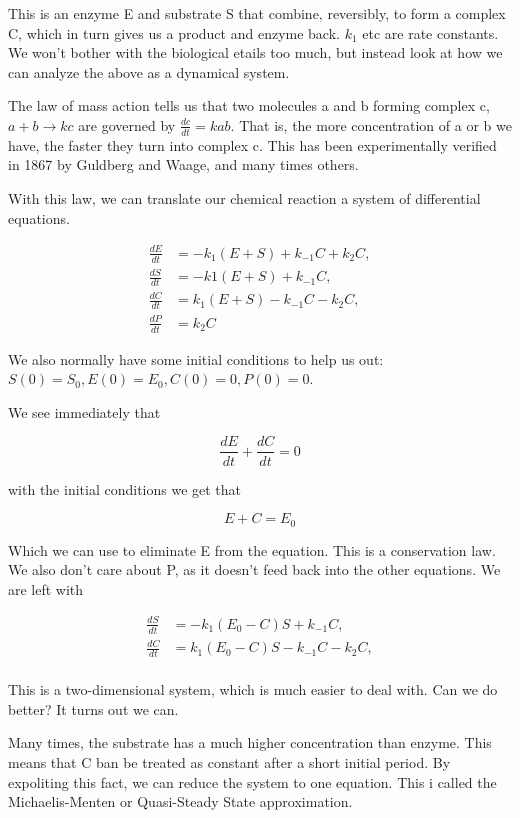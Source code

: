 \documentclass[12pt]{article}
\begin{document}
This is an enzyme E and substrate S that combine, reversibly, to form a complex
C, which in turn gives us a product and enzyme back. $k_1$ etc are rate
constants. We won't bother with the biological etails too much, but instead look
at how we can analyze the above as a dynamical system.

The law of mass action tells us that two molecules a and b forming complex c,
$a+b \rightarrow k c$ are governed by $\frac{dc}{dt} = kab$. That is, the more
concentration of a or b we have, the faster they turn into complex c. This has
been experimentally verified in 1867 by Guldberg and Waage, and many times
others.

With this law, we can translate our chemical reaction a system of differential
equations.

\begin{align}
\frac{dE}{dt} &= -k_1(E+S) + k_{-1}C + k_2C, \\
\frac{dS}{dt} &= -k1(E+S) + k_{-1}C, \\
\frac{dC}{dt} &= k_1(E+S) - k_{-1}C - k_2C, \\
\frac{dP}{dt} &= k_2C
\end{align}

We also normally have some initial conditions to help us out: $S(0) = S_0, E(0)
= E_0, C(0)=0, P(0)=0$.

We see immediately that

\begin{equation}
\frac{dE}{dt} + \frac{dC}{dt} = 0
\end{equation}

with the initial conditions we get that

\begin{equation}
E + C = E_0
\end{equation}

Which we can use to eliminate E from the equation. This is a conservation law.
We also don't care about P, as it doesn't feed back into the other equations. We
are left with

\begin{align}
\frac{dS}{dt} &= -k_1(E_0 - C)S + k_{-1}C, \\
\frac{dC}{dt} &= k_1(E_0 - C)S - k_{-1}C - k_2 C, \\
\end{align}

This is a two-dimensional system, which is much easier to deal with. Can we do
better? It turns out we can.

Many times, the substrate has a much higher concentration than enzyme. This
means that C ban be treated as constant after a short initial period. By
expoliting this fact, we can reduce the system to one equation. This i called
the Michaelis-Menten or Quasi-Steady State approximation.
\end{document}
